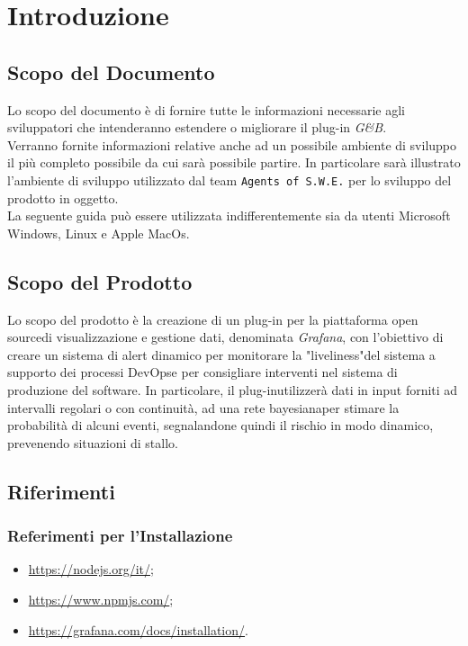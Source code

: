 \section{Introduzione}\label{Intro}
\subsection{Scopo del Documento}
Lo scopo del documento è di fornire tutte le informazioni necessarie agli sviluppatori che intenderanno estendere o migliorare il plug-in \textit{G\&B}.\\
Verranno fornite informazioni relative anche ad un possibile ambiente di sviluppo il più completo possibile da cui sarà possibile partire. In particolare sarà illustrato l'ambiente di sviluppo utilizzato dal team \texttt{Agents of S.W.E.} per lo sviluppo del prodotto in oggetto.\\
La seguente guida può essere utilizzata indifferentemente sia da utenti Microsoft Windows, Linux e Apple MacOs.


\subsection{Scopo del Prodotto}
Lo scopo del prodotto è la creazione di un plug-in per la piattaforma open source\glossario di visualizzazione e gestione dati, denominata \textit{Grafana}\glossario , con l’obiettivo di creare un sistema di alert dinamico per monitorare la "liveliness"\glossario del sistema a supporto dei processi DevOps\glossario e per consigliare interventi nel sistema di produzione del software.
In particolare, il plug-in\glossario utilizzerà dati in input forniti ad intervalli regolari o con continuità, ad una rete bayesiana\glossario per stimare la probabilità di alcuni eventi, segnalandone quindi il rischio in modo dinamico, prevenendo situazioni di stallo.


\subsection{Riferimenti}\label{Riferimenti}
\subsubsection{Referimenti per l'Installazione}
\begin{itemize}
	\item \url{https://nodejs.org/it/};
	\item \url{https://www.npmjs.com/};
	\item \url{https://grafana.com/docs/installation/}.
\end{itemize}

